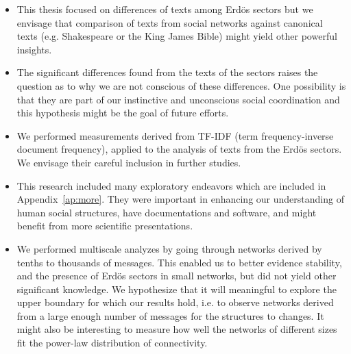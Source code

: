 \begin{itemize}
\item This thesis focused on differences of texts among Erd\"os sectors but we envisage that comparison of texts from social networks against canonical texts (e.g. Shakespeare or the King James Bible) might yield other powerful insights.
\item The significant differences found from the texts of the sectors raises the question as to why we are not conscious of these differences.
One possibility is that they are part of our instinctive and unconscious social coordination and this hypothesis might be the goal of future efforts.
\item We performed measurements derived from TF-IDF (term frequency-inverse document frequency),
	applied to the analysis of texts from the Erd\"os sectors.
		We envisage their careful inclusion in further studies.
	\item This research included many exploratory endeavors which are included in Appendix~\ref{ap:more}.
		They were important in enhancing our understanding of human social structures,
		have documentations and software, and might benefit from more scientific presentations.

\item We performed multiscale analyzes by going through networks derived by tenths to thousands of messages.
	This enabled us to better evidence stability, and the presence of Erd\"os sectors in small networks, 
		but did not yield other significant knowledge.
		We hypothesize that it will meaningful to explore the upper boundary for which our results hold,
		i.e. to observe networks derived from a large enough number of messages for the structures to changes.
		It might also be interesting to measure how well the networks of different sizes fit the power-law distribution
		of connectivity.
\end{itemize}







